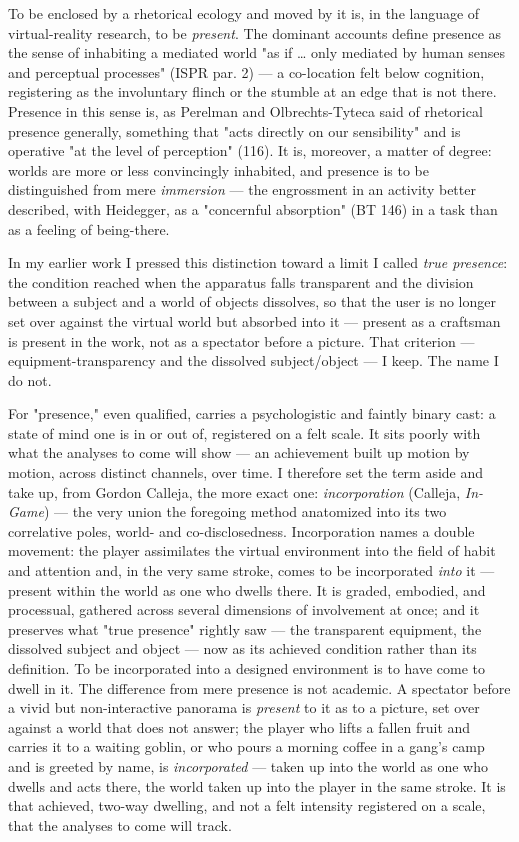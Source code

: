 \documentclass{article}
\begin{document}
To be enclosed by a rhetorical ecology and moved by it is, in the language of virtual-reality research, to be \textit{present}. The dominant accounts define presence as the sense of inhabiting a mediated world "as if … only mediated by human senses and perceptual processes" (ISPR par. 2) — a co-location felt below cognition, registering as the involuntary flinch or the stumble at an edge that is not there. Presence in this sense is, as Perelman and Olbrechts-Tyteca said of rhetorical presence generally, something that "acts directly on our sensibility" and is operative "at the level of perception" (116). It is, moreover, a matter of degree: worlds are more or less convincingly inhabited, and presence is to be distinguished from mere \textit{immersion} — the engrossment in an activity better described, with Heidegger, as a "concernful absorption" (BT 146) in a task than as a feeling of being-there.

In my earlier work I pressed this distinction toward a limit I called \textit{true presence}: the condition reached when the apparatus falls transparent and the division between a subject and a world of objects dissolves, so that the user is no longer set over against the virtual world but absorbed into it — present as a craftsman is present in the work, not as a spectator before a picture. That criterion — equipment-transparency and the dissolved subject/object — I keep. The name I do not.

For "presence," even qualified, carries a psychologistic and faintly binary cast: a state of mind one is in or out of, registered on a felt scale. It sits poorly with what the analyses to come will show — an achievement built up motion by motion, across distinct channels, over time. I therefore set the term aside and take up, from Gordon Calleja, the more exact one: \textit{incorporation} (Calleja, \textit{In-Game}) — the very union the foregoing method anatomized into its two correlative poles, world- and co-disclosedness. Incorporation names a double movement: the player assimilates the virtual environment into the field of habit and attention and, in the very same stroke, comes to be incorporated \textit{into} it — present within the world as one who dwells there. It is graded, embodied, and processual, gathered across several dimensions of involvement at once; and it preserves what "true presence" rightly saw — the transparent equipment, the dissolved subject and object — now as its achieved condition rather than its definition. To be incorporated into a designed environment is to have come to dwell in it. The difference from mere presence is not academic. A spectator before a vivid but non-interactive panorama is \textit{present} to it as to a picture, set over against a world that does not answer; the player who lifts a fallen fruit and carries it to a waiting goblin, or who pours a morning coffee in a gang's camp and is greeted by name, is \textit{incorporated} — taken up into the world as one who dwells and acts there, the world taken up into the player in the same stroke. It is that achieved, two-way dwelling, and not a felt intensity registered on a scale, that the analyses to come will track.
\end{document}
